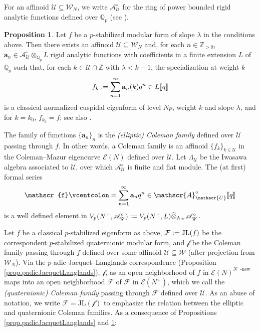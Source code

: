 \documentclass[a4paper]{amsart}
\numberwithin{equation}{section}
\theoremstyle{definition}
\newtheorem{proposition}[theorem]{Proposition}
\newcommand{\Q}{\mathbb{Q}}
\newcommand{\Z}{\mathbb{Z}}
\newcommand{\defeq}{\vcentcolon=}
\begin{document}
For an affinoid $\mathscr{U}\subseteq\mathscr{W}_N$, we write $\mathscr{A}_\mathscr{U}^\circ$ for the ring of power bounded rigid analytic functions defined over $\Q_p$ (see \cite[\S 2.1]{NuccioOchiai}).

\begin{proposition}\label{prop.ColemanFamilies}
Let $f$ be a $p$-stabilized modular form of slope $\lambda$ in the conditions above. Then there exists an affinoid $\mathscr{U}\subseteq\mathscr{W}_N$ and, for each $n\in\Z_{>0}$, $\mathbf{a}_n\in\mathscr{A}_{\mathscr{U}}^\circ\otimes_{\Q_p}L$ rigid analytic functions with coefficients in a finite extension $L$ of $\Q_p$ such that, for each $k\in\mathscr{U}\cap\Z$ with $\lambda<k-1$, the specialization at weight $k$ \[f_k\defeq\sum_{n=1}^\infty\mathbf{a}_n(k) q^n\in L[\![q]\!]\] is a classical normalized
cuspidal eigenform of level $Np$, weight $k$ and slope $\lambda$, and for $k=k_0$, $f_{k_0}=f$; see also \cite[Theorem 4.6.4]{LoefflerZerbes.Rankin}.
\end{proposition}

The family of functions $\{\mathbf{a}_n\}_n$ is the \textit{(elliptic) Coleman family} defined over $\mathscr{U}$ passing through $f$. In other words, a Coleman family is an affinoid $\{f_k\}_{k\in\mathscr{U}}$ in the Coleman--Mazur eigencurve $\mathcal{E}(N)$ defined over $\mathscr{U}$. Let $\Lambda_\mathscr{U}$ be the Iwasawa algebra associated to $\mathscr{U}$, over which $\mathscr{A}_\mathscr{U}^\circ$ is finite and flat module. The (at first) formal series \[\mathscr{f}\defeq\sum_{n=1}^\infty\mathbf{a}_n q^n\in \mathscr{A}_{\mathscr{U}}^\circ[\![q]\!]\] is a well defined element in $V_p(N^+,\mathscr{A}_{\mathscr{U}}^\circ)\defeq V_p(N^+,L)\widehat{\otimes}_{\Lambda_{\mathscr{U}}}\mathscr{A}_{\mathscr{U}}^\circ$.

Let $f$ be a classical $p$-stabilized eigenform as above, $\mathcal{F}\defeq\mathrm{JL}(f)$ be the correspondent $p$-stabilized quaternionic modular form, and $\mathscr{f}$ be the Coleman family passing through $f$ defined over some affinoid $\mathscr{U}\subseteq\mathscr{W}$ (after projection from $\mathscr{W}_N$). Via the $p$-adic Jacquet--Langlands correspondence (Proposition \ref{prop.padicJacquetLanglands}), $\mathscr{f}$, as an open neighborhood of $f$ in $\mathcal{E}(N)^{N^{-}\text{-new}}$ maps into an open neighborhood $\mathscr{F}$ of $\mathcal{F}$ in $\mathscr{E}(N^+)$, which we call the \textit{(quaternionic) Coleman family} passing through $\mathcal{F}$ defined over $\mathscr{U}$. As an abuse of notation, we write $\mathscr{F}=\mathrm{JL}(\mathscr{f})$ to emphasize the relation between the elliptic and quaternionic Coleman families. As a consequence of Propositions \ref{prop.padicJacquetLanglands} and \ref{prop.ColemanFamilies}:
\end{document}
